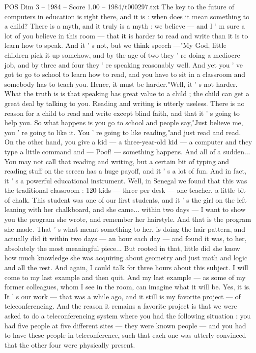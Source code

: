 \begin{textsample}{POS Dim 3 – 1984 – Score 1.00 – 1984/t000297.txt}
The key to the future of computers in education is right there, and it is : when does it mean something to a child?
There is a myth, and it truly is a myth : we believe — and I ' m sure a lot of you believe in this room — that it is harder to read and write than it is to learn how to speak.
And it ' s not, but we think speech —"My God, little children pick it up somehow, and by the age of two they ' re doing a mediocre job, and by three and four they ' re speaking reasonably well.
And yet you ' ve got to go to school to learn how to read, and you have to sit in a classroom and somebody has to teach you.
Hence, it must be harder."Well, it ' s not harder.
What the truth is is that speaking has great value to a child ; the child can get a great deal by talking to you.
Reading and writing is utterly useless.
There is no reason for a child to read and write except blind faith, and that it ' s going to help you.
So what happens is you go to school and people say,"Just believe me, you ' re going to like it.
You ' re going to like reading,"and just read and read.
On the other hand, you give a kid — a three-year-old kid — a computer and they type a little command and — Poof! — something happens.
And all of a sudden...
You may not call that reading and writing, but a certain bit of typing and reading stuff on the screen has a huge payoff, and it ' s a lot of fun.
And in fact, it ' s a powerful educational instrument.
Well, in Senegal we found that this was the traditional classroom : 120 kids — three per desk — one teacher, a little bit of chalk.
This student was one of our first students, and it ' s the girl on the left leaning with her chalkboard, and she came... within two days — I want to show you the program she wrote, and remember her hairstyle.
And that is the program she made.
That ' s what meant something to her, is doing the hair pattern, and actually did it within two days — an hour each day — and found it was, to her, absolutely the most meaningful piece...
But rooted in that, little did she know how much knowledge she was acquiring about geometry and just math and logic and all the rest.
And again, I could talk for three hours about this subject.
I will come to my last example and then quit.
And my last example — as some of my former colleagues, whom I see in the room, can imagine what it will be.
Yes, it is.
It ' s our work — that was a while ago, and it still is my favorite project — of teleconferencing.
And the reason it remains a favorite project is that we were asked to do a teleconferencing system where you had the following situation : you had five people at five different sites — they were known people — and you had to have these people in teleconference, such that each one was utterly convinced that the other four were physically present.

\end{textsample}
